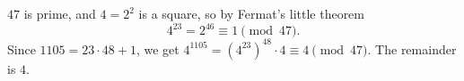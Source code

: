 $47$ is prime, and $4=2^2$ is a square, so by Fermat's little theorem
\[
4^{23}=2^{46}\equiv1\pmod{47}.
\]
Since $1105=23\cdot48+1$, we get $4^{1105}=\left(4^{23}\right)^{48}\cdot4\equiv4\pmod{47}$. The remainder is $\boxed{4}$.
